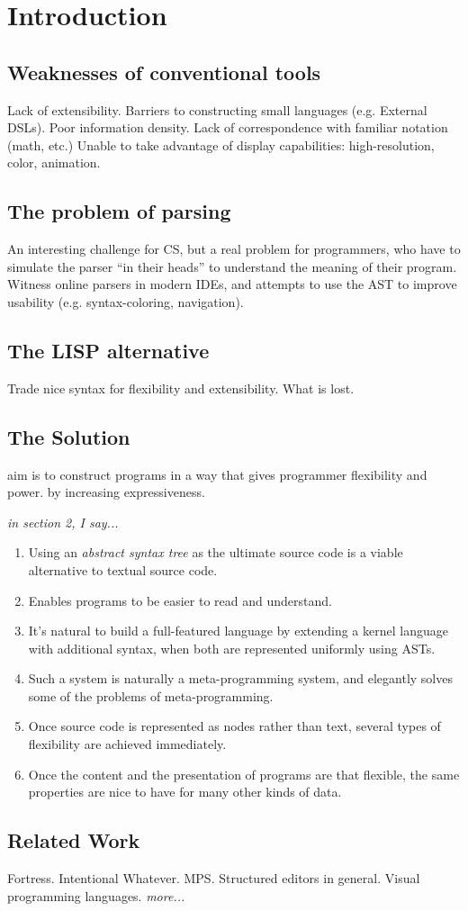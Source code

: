 \section{Introduction}



\subsection{Weaknesses of conventional tools}
Lack of extensibility. Barriers to constructing small languages (e.g. External DSLs). Poor information density. Lack of correspondence with familiar notation (math, etc.) Unable to take advantage of display capabilities: high-resolution, color, animation.

\subsection{The problem of parsing}
An interesting challenge for CS, but a real problem for programmers, who have to simulate the parser ``in their heads'' to understand the meaning of their program. Witness online parsers in modern IDEs, and attempts to use the AST to improve usability (e.g. syntax-coloring, navigation).

\subsection{The LISP alternative}
Trade nice syntax for flexibility and extensibility. What is lost.

\subsection{The Solution}
aim is to construct programs in a way that gives programmer flexibility and power. by increasing expressiveness.

\textit{in section 2, I say...}

\begin{enumerate}
\item Using an \emph{abstract syntax tree} as the ultimate source code is a viable alternative to textual source code.
\item Enables programs to be easier to read and understand.
\item It's natural to build a full-featured language by extending a kernel language with additional syntax, when both are represented uniformly using ASTs.
\item Such a system is naturally a meta-programming system, and elegantly solves some of the problems of meta-programming.
\item Once source code is represented as nodes rather than text, several types of flexibility are achieved immediately.
\item Once the content and the presentation of programs are that flexible, the same properties are nice to have for many other kinds of data.
\end{enumerate}


\subsection{Related Work}
Fortress. Intentional Whatever. MPS. Structured editors in general. Visual programming languages. \textit{more...}

